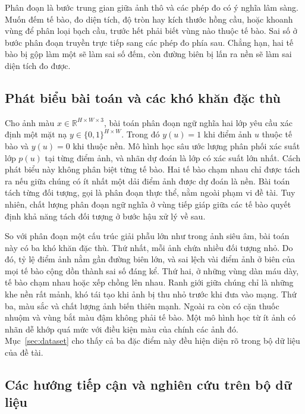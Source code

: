 Phân đoạn là bước trung gian giữa ảnh thô và các phép đo có ý nghĩa lâm sàng. Muốn đếm tế bào, đo diện tích, độ tròn hay kích thước hồng cầu, hoặc khoanh vùng để phân loại bạch cầu, trước hết phải biết vùng nào thuộc tế bào. Sai số ở bước phân đoạn truyền trực tiếp sang các phép đo phía sau. Chẳng hạn, hai tế bào bị gộp làm một sẽ làm sai số đếm, còn đường biên bị lấn ra nền sẽ làm sai diện tích đo được.

\subsection{Phát biểu bài toán và các khó khăn đặc thù}

Cho ảnh màu $x \in \mathbb{R}^{H\times W\times 3}$, bài toán phân đoạn ngữ nghĩa hai lớp yêu cầu xác định một mặt nạ $y \in \{0,1\}^{H\times W}$. Trong đó $y(u)=1$ khi điểm ảnh $u$ thuộc tế bào và $y(u)=0$ khi thuộc nền. Mô hình học sâu ước lượng phân phối xác suất lớp $p(u)$ tại từng điểm ảnh, và nhãn dự đoán là lớp có xác suất lớn nhất. Cách phát biểu này không phân biệt từng tế bào. Hai tế bào chạm nhau chỉ được tách ra nếu giữa chúng có ít nhất một dải điểm ảnh được dự đoán là nền. Bài toán tách từng đối tượng, gọi là phân đoạn thực thể, nằm ngoài phạm vi đề tài. Tuy nhiên, chất lượng phân đoạn ngữ nghĩa ở vùng tiếp giáp giữa các tế bào quyết định khả năng tách đối tượng ở bước hậu xử lý về sau.

So với phân đoạn một cấu trúc giải phẫu lớn như trong ảnh siêu âm, bài toán này có ba khó khăn đặc thù. Thứ nhất, mỗi ảnh chứa nhiều đối tượng nhỏ. Do đó, tỷ lệ điểm ảnh nằm gần đường biên lớn, và sai lệch vài điểm ảnh ở biên của mọi tế bào cộng dồn thành sai số đáng kể. Thứ hai, ở những vùng dàn máu dày, tế bào chạm nhau hoặc xếp chồng lên nhau. Ranh giới giữa chúng chỉ là những khe nền rất mảnh, khó tái tạo khi ảnh bị thu nhỏ trước khi đưa vào mạng. Thứ ba, màu sắc và chất lượng ảnh biến thiên mạnh. Ngoài ra còn có cặn thuốc nhuộm và vùng bắt màu đậm không phải tế bào. Một mô hình học từ ít ảnh có nhãn dễ khớp quá mức với điều kiện màu của chính các ảnh đó. Mục~\ref{sec:dataset} cho thấy cả ba đặc điểm này đều hiện diện rõ trong bộ dữ liệu của đề tài.

\subsection{Các hướng tiếp cận và nghiên cứu trên bộ dữ liệu}

